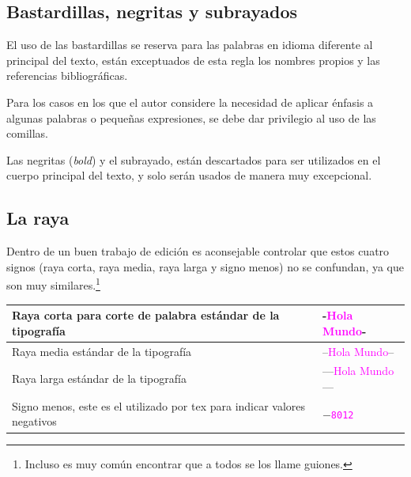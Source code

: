 \documentclass{book}
\begin{document}
{{{{{{{\subsection{Bastardillas, negritas y subrayados}

El uso de las bastardillas se reserva para las palabras en idioma diferente al principal del texto, están exceptuados de esta regla los nombres propios y las referencias bibliográficas.

Para los casos en los que el autor considere la necesidad de aplicar énfasis a algunas palabras o pequeñas expresiones, se debe dar privilegio al uso de las comillas.

Las negritas (\emph{bold}) y el subrayado, están descartados para ser utilizados en el cuerpo principal del texto, y solo serán usados de manera muy excepcional.

\subsection{La raya}

Dentro de un buen trabajo de edición es aconsejable controlar que estos cuatro signos (raya corta, raya media, raya larga y signo menos) no se confundan, ya que son muy similares.\footnote{Incluso es muy común encontrar que a todos se los llame guiones.}

\begin{table}[!h]
\begin{mdframed}[linewidth=.5pt,linecolor=black!30,roundcorner=3pt,backgroundcolor=yellow!15]
\centering
\begin{tabular}{m{6cm} | l}
\toprule
Raya corta para corte de palabra estándar de la tipografía & \large{-\textcolor{magenta}{Hola Mundo}-} \\
\midrule
Raya media estándar de la tipografía & \large{--\textcolor{magenta}{Hola Mundo}--}\\
\midrule
Raya larga estándar de la tipografía & \large{---\textcolor{magenta}{Hola Mundo}---}\\
\midrule
Signo menos, este es el utilizado por \gls{tex} para indicar valores negativos & \large{$-$\textcolor{magenta}{\tt{\num{8012}}}}\\
\bottomrule
\end{tabular}
\end{mdframed}
\end{table}

}}}}}}}
\end{document}
